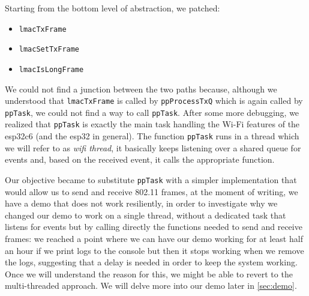 Starting from the bottom level of abstraction, we patched:
\begin{itemize}
\item \texttt{lmacTxFrame}
\item \texttt{lmacSetTxFrame}
\item \texttt{lmacIsLongFrame}
\end{itemize}
We could not find a junction between the two paths because,
although we understood that \texttt{lmacTxFrame} is called 
by \texttt{ppProcessTxQ} which is again called by \texttt{ppTask},
we could not find a way to call \texttt{ppTask}.
After some more debugging, we realized that \texttt{ppTask} is
exactly the main task handling the Wi-Fi features of the esp32c6
(and the esp32 in general).
The function \texttt{ppTask} runs in a thread which we will refer
to as \textit{wifi thread}, it basically keeps listening over
a shared queue for events and, based on the received event, it
calls the appropriate function.

Our objective became to substitute \texttt{ppTask} with a simpler implementation
that would allow us to send and receive 802.11 frames, at the moment of writing,
we have a demo that does not work resiliently, in order to investigate why 
we changed our demo to work on a single thread, without a dedicated
task that listens for events but by calling directly the functions needed 
to send and receive frames: we reached a point where we can have our demo
working for at least half an hour if we print logs to the console but 
then it stops working when we remove the logs, suggesting that a delay is
needed in order to keep the system working.
Once we will understand the reason for this, we might be able to revert
to the multi-threaded approach.
We will delve more into our demo later in \ref{sec:demo}.

